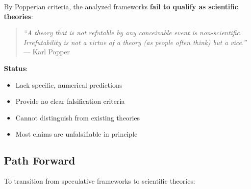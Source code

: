By Popperian criteria, the analyzed frameworks \textbf{fail to qualify as scientific theories}:

\begin{quote}
\textit{``A theory that is not refutable by any conceivable event is non-scientific. Irrefutability is not a virtue of a theory (as people often think) but a vice.''} --- Karl Popper
\end{quote}

\textbf{Status}:
\begin{itemize}
    \item[$\times$] Lack specific, numerical predictions
    \item[$\times$] Provide no clear falsification criteria
    \item[$\times$] Cannot distinguish from existing theories
    \item[$\times$] Most claims are unfalsifiable in principle
\end{itemize}

\subsection{Path Forward}

To transition from speculative frameworks to scientific theories:

